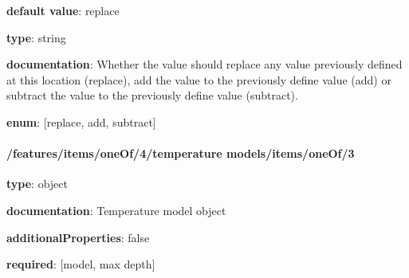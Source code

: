 \begin{itemized}
\item {\bf default value}: replace
\item {\bf type}: string
\item {\bf documentation}: Whether the value should replace any value previously defined at this location (replace), add the value to the previously define value (add) or subtract the value to the previously define value (subtract).
\item {\bf enum}: [replace, add, subtract]\end{itemized}\paragraph{/features/items/oneOf/4/temperature models/items/oneOf/3} \begin{itemized}
\item {\bf type}: object
\item {\bf documentation}: Temperature model object
\item {\bf additionalProperties}: false
\item {\bf required}: [model, max depth]\end{itemized}
